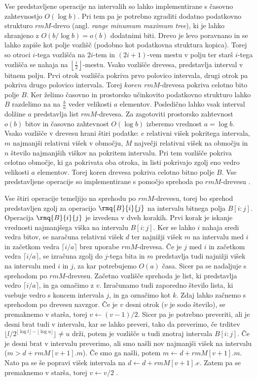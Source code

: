 Vse predstavljene operacije na intervalih so lahko implementirane s časovno zahtevnostjo $O(\log{b})$. Pri tem pa je potrebno zgraditi dodatno podatkovno strukturo $rmM$-drevo (angl. \textit{range minumum maximum tree}), ki je lahko shranjeno z $O(b/\log{b})=o(b)$ dodatnimi biti. Drevo je levo poravnano in se lahko zapiše kot polje vozlišč (podobno kot podatkovna struktura kopica). Torej so otroci $i$-tega vozlišča na $2i$-tem in $(2i+1)$-vem mestu v polju ter starš $i$-tega vozlišča se nahaja na $\left\lfloor\frac{i}{2}\right\rfloor$-mestu. Vsako vozlišče drevesa, predstavlja interval v bitnem polju. Prvi otrok vozlišča pokriva prvo polovico intervala, drugi otrok pa pokriva drugo polovico intervala. Torej $koren$ $rmM$-drevesa pokriva celotno bito polje $B$. Ker želimo časovno in prostorsko učinkovito podatkovno strukturo lahko $B$ razdelimo na na $\frac{b}{a}$ veder velikosti $a$ elementov. Posledično lahko vsak interval dolžine $a$ predstavlja list $rmM$-drevesa. Za zagotoviti prostorsko zahtevnost $o(b)$ bitov in časovno zahtevnost $O(\log{b})$ izberemo vrednost $a = \log{b}$. Vsako vozlišče v drevesu hrani štiri podatke: $e$ relativni višek pokritega intervala, $m$ najmanjši relativni višek v območju, $M$ največji relativni višek na območju in $n$ število najmanjših viškov na pokritem intervalu. Pri tem vozlišče pokriva celotno območje, ki ga pokrivata oba otroka, in listi pokrivajo zgolj eno vedro velikosti $a$ elementov. Torej koren drevesa pokriva celotno bitno polje $B$. Vse predstavljene operacije so implementirane s pomočjo sprehoda po $rmM$-drevesu \cite{Navarro2016}.

Vse štiri operacije temeljijo na sprehodu po $rmM$-drevesu, torej bo sprehod predstavljen zgolj za operacijo $\rmq{B}{i}{j}$ na intervalu bitnega polja $B[i:j]$. Operacija $\rmq{B}{i}{j}$ je izvedena v dveh korakih. Prvi korak je iskanje vrednosti najmanjšega viška na intervalu $B[i:j]$. Ker se lahko $i$ nahaja sredi vedra bitov, se naračuna relativni višek $d$ ter najnižji višek $m$ na intervalu med $i$ in začetkom vedra $\lceil i/a\rceil$ brez uporabe $rmM$-drevesa. Če je $j$ med $i$ in začetkom vedra $\lceil i/a\rceil$, se izračuna zgolj do $j$-tega bita in $m$ predstavlja tudi najnižji višek na intervalu med $i$ in $j$, za kar potrebujemo $O(a)$ časa. Sicer pa se nadaljuje s sprehodom po $rmM$-drevesu. Začetno vozlišče sprehoda je list, ki predstavlja vedro $\lceil i/a\rceil$, in ga označimo z $v$. Izračunamo tudi zaporedno število lista, ki vsebuje vedro s koncem intervala $j$, in ga označimo kot $k$. Zdaj lahko začnemo s sprehodom po drevesu navzgor. Če je $v$ desni otrok ($v$ je sodo število), se premaknemo v starša, torej $v\leftarrow (v-1)/2$. Sicer pa je potrebno preveriti, ali je desni brat tudi v intervalu, kar se lahko preveri, tako da preverimo, če trditev $\lfloor l/2^{\lfloor \log l\rfloor- \lfloor \log u \rfloor}\rfloor\ne u$ drži, potem je vozlišče $u$ tudi znotraj intervala $B[i:j]$. Če je desni brat v intervalu preverimo, ali smo našli nov najmanjši višek na intervalu ($m>d+rmM[v+1].m$). Če smo ga našli, potem $m\leftarrow d+rmM[v+1].m$. Nato pa se še popravi višek intervala na $d\leftarrow d+rmM[v+1].e$. Zatem pa se premaknemo v starša, torej $v\leftarrow v/2$ \cite{Navarro2016}.


